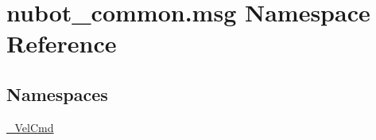 \hypertarget{namespacenubot__common_1_1msg}{\section{nubot\-\_\-common.\-msg Namespace Reference}
\label{namespacenubot__common_1_1msg}
}
\subsection*{Namespaces}
\begin{DoxyCompactItemize}
\item 
\hyperlink{namespacenubot__common_1_1msg_1_1__VelCmd}{\-\_\-\-Vel\-Cmd}
\end{DoxyCompactItemize}
